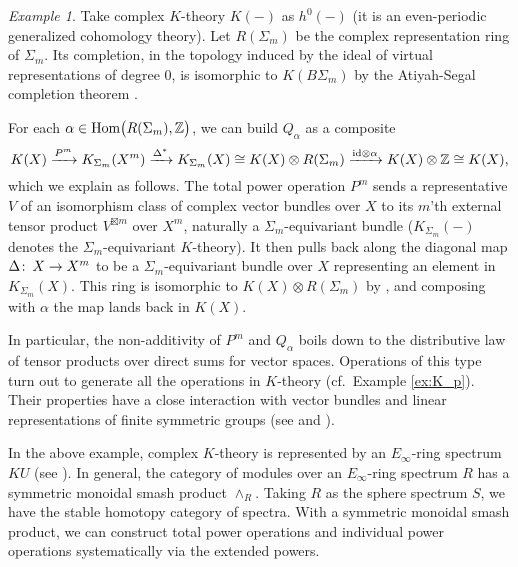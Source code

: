 \documentclass{gtpart}
\theoremstyle{definition}
\theoremstyle{remark}
\newtheorem{ex}[thm]{Example}
\def\co{\colon\thinspace}
\newcommand{\mb}[1]{\mathbb{#1}}
\newcommand{\Hom}{\ensuremath{{\rm Hom}}}
\newcommand{\BZ}{{\mb Z}}
\newcommand{\A}{\alpha}
\numberwithin{equation}{section}
\numberwithin{thm}{section}
\begin{document}
\begin{ex}
\label{ex:KU}
 Take complex $K$-theory $K(-)$ as $h^0(-)$ (it is an even-periodic 
 generalized cohomology theory).  Let $R(\Sigma_m)$ be the complex 
 representation ring of $\Sigma_m$.  Its completion, in the topology 
 induced by the ideal of virtual representations of degree 0, is 
 isomorphic to $K(B\Sigma_m)$ by the Atiyah-Segal completion theorem 
 \cite{atiyahsegal}.  

 For each $\A \in \Hom \big( R(\Sigma_m), \BZ \big)$, we can build 
 $Q_\A$ as a composite 
 \[
  K(X) \xrightarrow{P^m} K_{\Sigma_m}(X^m) \xrightarrow{\Delta^*} 
  K_{\Sigma_m}(X) \cong K(X) \otimes R(\Sigma_m) 
  \xrightarrow{{\rm id} \otimes \A} K(X) \otimes \BZ \cong K(X), 
 \]
 which we explain as follows.  The total power operation $P^m$ sends a 
 representative $V$ of an isomorphism class of complex vector bundles 
 over $X$ to its $m$'th external tensor product $V^{\boxtimes m}$ over 
 $X^m$, naturally a $\Sigma_m$-equivariant bundle ($K_{\Sigma_m}(-)$ 
 denotes the $\Sigma_m$-equivariant $K$-theory).  It then pulls back 
 along the diagonal map $\Delta \co X \to X^m$ to be a 
 $\Sigma_m$-equivariant bundle over $X$ representing an element in 
 $K_{\Sigma_m}(X)$.  This ring is isomorphic to 
 $K(X) \otimes R(\Sigma_m)$ by \cite[Proposition 2.2]{segal}, and 
 composing with $\A$ the map lands back in $K(X)$.  

 In particular, the non-additivity of $P^m$ and $Q_\A$ boils down to the 
 distributive law of tensor products over direct sums for vector spaces.  
 Operations of this type turn out to generate all the operations in 
 $K$-theory (cf.~Example \ref{ex:K_p}).  Their properties have a close 
 interaction with vector bundles and linear representations of finite 
 symmetric groups (see \cite{adamsvector, atiyah} and 
 \cite[Sections 1-4]{lpo}).  
\end{ex}

In the above example, complex $K$-theory is represented by an 
$E_\infty$-ring spectrum $KU$ (see \cite[Theorem VIII.4.3]{EKMM}).  In 
general, the category of modules over an $E_\infty$-ring spectrum $R$ 
has a symmetric monoidal smash product $\wedge_R$.  Taking $R$ as the 
sphere spectrum $S$, we have the stable homotopy category of spectra.  
With a symmetric monoidal smash product, we can construct total power 
operations and individual power operations systematically via the 
extended powers.  
\end{document}
